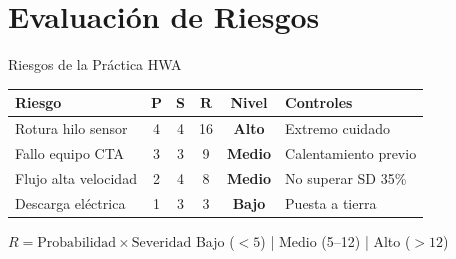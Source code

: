 \documentclass[aspectratio=169,12pt]{beamer}
\begin{document}
\section{Evaluación de Riesgos}

\begin{frame}{Riesgos de la Práctica HWA}
	\centering\small
	\begin{tabular}{>{\raggedright\arraybackslash}p{2.8cm}
		c c c c l}
		\toprule
		\textbf{Riesgo} & \textbf{P}                             & \textbf{S}
		                & $\boldsymbol{R}$                       & \textbf{Nivel}
		                & \textbf{Controles}                                           \\
		\midrule
		\rowcolor{aerored!15}
		Rotura hilo sensor
		                & 4                                      & 4              & 16
		                & \textcolor{aerored}{\textbf{Alto}}
		                & Extremo cuidado                                              \\
		\rowcolor{aeroyellow!15}
		Fallo equipo CTA
		                & 3                                      & 3              & 9
		                & \textcolor{aeroyellow}{\textbf{Medio}}
		                & Calentamiento previo                                         \\
		\rowcolor{aeroyellow!15}
		Flujo alta velocidad
		                & 2                                      & 4              & 8
		                & \textcolor{aeroyellow}{\textbf{Medio}}
		                & No superar SD 35\%                                           \\
		\rowcolor{aerogreen!15}
		Descarga eléctrica
		                & 1                                      & 3              & 3
		                & \textcolor{aerogreen}{\textbf{Bajo}}
		                & Puesta a tierra                                              \\
		\bottomrule
	\end{tabular}

	\vspace{0.4em}
	\begin{block}{$R = \text{Probabilidad} \times \text{Severidad}$}
		Bajo ($<5$) \quad | \quad Medio (5--12)
		\quad | \quad Alto ($>12$)
	\end{block}
\end{frame}
\end{document}
